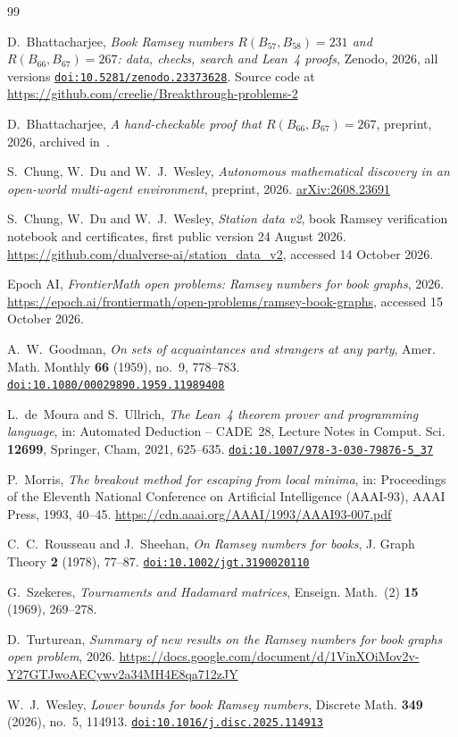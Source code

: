 \documentclass[11pt]{amsart}
\theoremstyle{definition}
\theoremstyle{remark}
\numberwithin{equation}{section}
\newcommand{\doi}[1]{\href{https://doi.org/#1}{\nolinkurl{doi:#1}}}
\begin{document}
\begin{thebibliography}{99}

D.~Bhattacharjee, \emph{Book Ramsey numbers $R(B_{57},B_{58})=231$ and $R(B_{66},B_{67})=267$: data, checks, search and Lean~4 proofs}, Zenodo, 2026, all versions \doi{10.5281/zenodo.23373628}. Source code at \url{https://github.com/creelie/Breakthrough-problems-2}

D.~Bhattacharjee, \emph{A hand-checkable proof that $R(B_{66},B_{67})=267$}, preprint, 2026, archived in~\cite{Ar}.

S.~Chung, W.~Du and W.~J.~Wesley, \emph{Autonomous mathematical discovery in an open-world multi-agent environment}, preprint, 2026. \href{https://arxiv.org/abs/2608.23691}{arXiv:2608.23691}

S.~Chung, W.~Du and W.~J.~Wesley, \emph{Station data v2}, book Ramsey verification notebook and certificates, first public version 24 August 2026. \url{https://github.com/dualverse-ai/station_data_v2}, accessed 14 October 2026.

Epoch AI, \emph{FrontierMath open problems: Ramsey numbers for book graphs}, 2026. \url{https://epoch.ai/frontiermath/open-problems/ramsey-book-graphs}, accessed 15 October 2026.

A.~W.~Goodman, \emph{On sets of acquaintances and strangers at any party}, Amer. Math. Monthly \textbf{66} (1959), no.~9, 778--783. \doi{10.1080/00029890.1959.11989408}

L.~de~Moura and S.~Ullrich, \emph{The Lean~4 theorem prover and programming language}, in: Automated Deduction -- CADE~28, Lecture Notes in Comput. Sci. \textbf{12699}, Springer, Cham, 2021, 625--635. \doi{10.1007/978-3-030-79876-5_37}

P.~Morris, \emph{The breakout method for escaping from local minima}, in: Proceedings of the Eleventh National Conference on Artificial Intelligence (AAAI-93), AAAI Press, 1993, 40--45. \url{https://cdn.aaai.org/AAAI/1993/AAAI93-007.pdf}

C.~C.~Rousseau and J.~Sheehan, \emph{On Ramsey numbers for books}, J. Graph Theory \textbf{2} (1978), 77--87. \doi{10.1002/jgt.3190020110}

G.~Szekeres, \emph{Tournaments and Hadamard matrices}, Enseign. Math.~(2) \textbf{15} (1969), 269--278.

D.~Turturean, \emph{Summary of new results on the Ramsey numbers for book graphs open problem}, 2026. \url{https://docs.google.com/document/d/1VinXOiMov2v-Y27GTJwoAECywv2a34MH4E8qa712zJY}

W.~J.~Wesley, \emph{Lower bounds for book Ramsey numbers}, Discrete Math. \textbf{349} (2026), no.~5, 114913. \doi{10.1016/j.disc.2025.114913}

\end{thebibliography}
\end{document}
